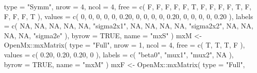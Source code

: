 \documentclass[
]{book}
\newenvironment{Shaded}{\begin{snugshade}}{\end{snugshade}}
\newcommand{\AttributeTok}[1]{\textcolor[rgb]{0.77,0.63,0.00}{#1}}
\newcommand{\ConstantTok}[1]{\textcolor[rgb]{0.00,0.00,0.00}{#1}}
\newcommand{\DecValTok}[1]{\textcolor[rgb]{0.00,0.00,0.81}{#1}}
\newcommand{\FloatTok}[1]{\textcolor[rgb]{0.00,0.00,0.81}{#1}}
\newcommand{\FunctionTok}[1]{\textcolor[rgb]{0.00,0.00,0.00}{#1}}
\newcommand{\NormalTok}[1]{#1}
\newcommand{\OtherTok}[1]{\textcolor[rgb]{0.56,0.35,0.01}{#1}}
\newcommand{\SpecialCharTok}[1]{\textcolor[rgb]{0.00,0.00,0.00}{#1}}
\newcommand{\StringTok}[1]{\textcolor[rgb]{0.31,0.60,0.02}{#1}}
\theoremstyle{definition}
\theoremstyle{definition}
\theoremstyle{definition}
\theoremstyle{remark}
\begin{document}
\begin{Shaded}
\begin{Highlighting}[]
  \AttributeTok{type =} \StringTok{"Symm"}\NormalTok{,}
  \AttributeTok{nrow =} \DecValTok{4}\NormalTok{,}
  \AttributeTok{ncol =} \DecValTok{4}\NormalTok{,}
  \AttributeTok{free =} \FunctionTok{c}\NormalTok{(}
\NormalTok{    F, F, F, F,}
\NormalTok{    F, T, F, F,}
\NormalTok{    F, F, T, F,}
\NormalTok{    F, F, F, T}
\NormalTok{  ),}
  \AttributeTok{values =} \FunctionTok{c}\NormalTok{(}
    \DecValTok{0}\NormalTok{,    }\DecValTok{0}\NormalTok{,    }\DecValTok{0}\NormalTok{,    }\DecValTok{0}\NormalTok{,}
    \DecValTok{0}\NormalTok{, }\FloatTok{0.20}\NormalTok{,    }\DecValTok{0}\NormalTok{,    }\DecValTok{0}\NormalTok{,}
    \DecValTok{0}\NormalTok{,    }\DecValTok{0}\NormalTok{, }\FloatTok{0.20}\NormalTok{,    }\DecValTok{0}\NormalTok{,}
    \DecValTok{0}\NormalTok{,    }\DecValTok{0}\NormalTok{,    }\DecValTok{0}\NormalTok{, }\FloatTok{0.20}
\NormalTok{  ),}
  \AttributeTok{labels =} \FunctionTok{c}\NormalTok{(}
    \ConstantTok{NA}\NormalTok{, }\ConstantTok{NA}\NormalTok{, }\ConstantTok{NA}\NormalTok{, }\ConstantTok{NA}\NormalTok{,}
    \ConstantTok{NA}\NormalTok{, }\StringTok{"sigma2x1"}\NormalTok{, }\ConstantTok{NA}\NormalTok{, }\ConstantTok{NA}\NormalTok{,}
    \ConstantTok{NA}\NormalTok{, }\ConstantTok{NA}\NormalTok{, }\StringTok{"sigma2x2"}\NormalTok{, }\ConstantTok{NA}\NormalTok{,}
    \ConstantTok{NA}\NormalTok{, }\ConstantTok{NA}\NormalTok{, }\ConstantTok{NA}\NormalTok{, }\StringTok{"sigma2e"}
\NormalTok{  ),}
  \AttributeTok{byrow =} \ConstantTok{TRUE}\NormalTok{,}
  \AttributeTok{name =} \StringTok{"mxS"}
\NormalTok{)}
\NormalTok{mxM }\OtherTok{\textless{}{-}}\NormalTok{ OpenMx}\SpecialCharTok{::}\FunctionTok{mxMatrix}\NormalTok{(}
  \AttributeTok{type =} \StringTok{"Full"}\NormalTok{,}
  \AttributeTok{nrow =} \DecValTok{1}\NormalTok{,}
  \AttributeTok{ncol =} \DecValTok{4}\NormalTok{,}
  \AttributeTok{free =} \FunctionTok{c}\NormalTok{(}
\NormalTok{    T, T, T, F}
\NormalTok{  ),}
  \AttributeTok{values =} \FunctionTok{c}\NormalTok{(}
    \FloatTok{0.20}\NormalTok{,}
    \FloatTok{0.20}\NormalTok{,}
    \FloatTok{0.20}\NormalTok{,}
    \DecValTok{0}
\NormalTok{  ),}
  \AttributeTok{labels =} \FunctionTok{c}\NormalTok{(}
    \StringTok{"beta0"}\NormalTok{,}
    \StringTok{"mux1"}\NormalTok{,}
    \StringTok{"mux2"}\NormalTok{,}
    \ConstantTok{NA}
\NormalTok{  ),}
  \AttributeTok{byrow =} \ConstantTok{TRUE}\NormalTok{,}
  \AttributeTok{name =} \StringTok{"mxM"}
\NormalTok{)}
\NormalTok{mxF }\OtherTok{\textless{}{-}}\NormalTok{ OpenMx}\SpecialCharTok{::}\FunctionTok{mxMatrix}\NormalTok{(}
  \AttributeTok{type =} \StringTok{"Full"}\NormalTok{,}

\end{Highlighting}
\end{Shaded}
\end{document}
